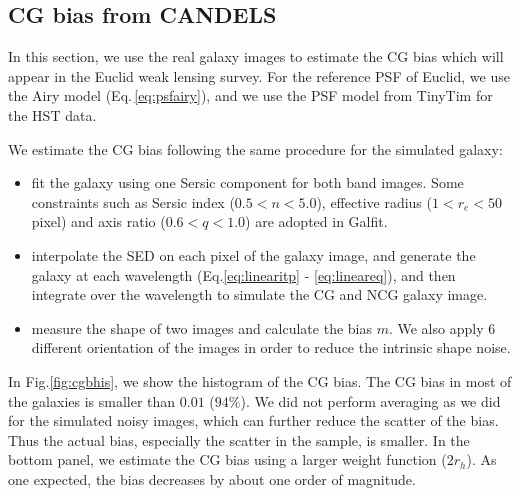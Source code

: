 \documentclass[useAMS,usenatbib]{mnras}
\begin{document}
\subsection{CG bias from CANDELS}

In this section, we use the real galaxy images to estimate the CG bias
which will appear in the Euclid weak lensing survey. For the reference
PSF of Euclid, we use the Airy model (Eq.\,\ref{eq:psfairy}), and we use
the PSF model from TinyTim for the HST data.

We estimate the CG bias following the same procedure for the simulated galaxy:
\begin{itemize}
  \item
    fit the galaxy using one Sersic component for both band
    images. Some constraints such as Sersic index ($0.5<n<5.0$),
    effective radius ($1<r_e<50$ pixel) and axis ratio ($0.6<q<1.0$)
    are adopted in Galfit.
  \item
    interpolate the SED on each pixel of the galaxy image, and
    generate the galaxy at each wavelength (Eq.\ref{eq:linearitp} -
    \ref{eq:lineareq}), and then integrate over the wavelength to
    simulate the CG and NCG galaxy image.
  \item
    measure the shape of two images and calculate the bias $m$. We
    also apply $6$ different orientation of the images in order
    to reduce the intrinsic shape noise.
\end{itemize}
%
In Fig.\ref{fig:cgbhis}, we show the histogram of the CG bias. The CG
bias in most of the galaxies is smaller than $0.01$ ($94\%$). We did
not perform averaging as we did for the simulated noisy images, which
can further reduce the scatter of the bias. Thus the actual bias,
especially the scatter in the sample, is smaller. In the bottom
panel, we estimate the CG bias using a larger weight function
($2r_h$). As one expected, the bias decreases by about one order of
magnitude.

%
\end{document}
